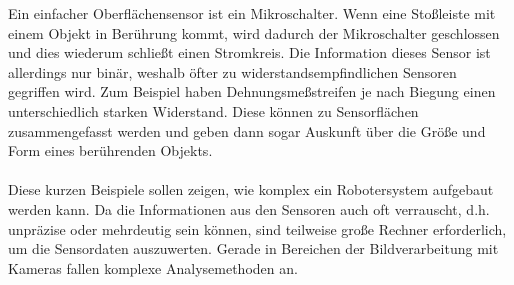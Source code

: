 Ein einfacher Oberflächensensor ist ein Mikroschalter. Wenn eine Stoßleiste mit einem Objekt in Berührung kommt, wird dadurch der Mikroschalter geschlossen und dies wiederum schließt einen Stromkreis. Die Information dieses Sensor ist allerdings nur binär, weshalb öfter zu widerstandsempfindlichen Sensoren gegriffen wird. Zum Beispiel haben Dehnungsmeßstreifen je nach Biegung einen unterschiedlich starken Widerstand. Diese können zu Sensorflächen zusammengefasst werden und geben dann sogar Auskunft über die Größe und Form eines berührenden Objekts.
\\
\\
\noindent
Diese kurzen Beispiele sollen zeigen, wie komplex ein Robotersystem aufgebaut werden kann. Da die Informationen aus den Sensoren auch oft verrauscht, d.h. unpräzise oder mehrdeutig sein können, sind teilweise große Rechner erforderlich, um die Sensordaten auszuwerten. Gerade in Bereichen der Bildverarbeitung mit Kameras fallen komplexe Analysemethoden an.